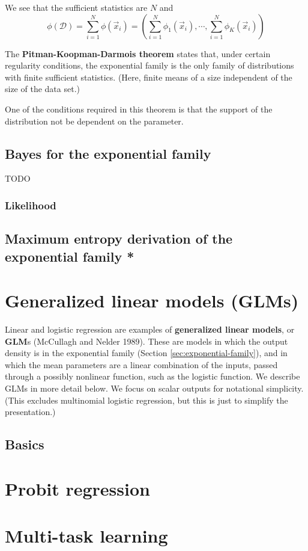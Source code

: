 We see that the sufficient statistics are $N$ and
\begin{equation}
\phi(\mathcal{D})=\sum\limits_{i=1}^N \phi(\vec{x}_i)=(\sum\limits_{i=1}^N \phi_1(\vec{x}_i),\cdots,\sum\limits_{i=1}^N \phi_K(\vec{x}_i))
\end{equation}

The \textbf{Pitman-Koopman-Darmois theorem} states that, under certain regularity conditions, the exponential family is the only family of distributions with finite sufficient statistics. (Here, finite means of a size independent of the size of the data set.)

One of the conditions required in this theorem is that the support of the distribution not be dependent on the parameter.


\subsection{Bayes for the exponential family}
\label{sec:Bayes-for-the-exponential-family}
TODO


\subsubsection{Likelihood}



\subsection{Maximum entropy derivation of the exponential family *}
\label{sec:Maximum-entropy-derivation-of-the-exponential-family}



\section{Generalized linear models (GLMs)}
\label{sec:GLMs}
Linear and logistic regression are examples of \textbf{generalized linear models}, or \textbf{GLM}s (McCullagh and Nelder 1989). These are models in which the output density is in the exponential family (Section \ref{sec:exponential-family}), and in which the mean parameters are a linear combination of the inputs, passed through a possibly nonlinear function, such as the logistic function. We describe GLMs in more detail below. We focus on scalar outputs for notational simplicity. (This excludes multinomial logistic regression, but this is just to simplify the presentation.)


\subsection{Basics}



\section{Probit regression}



\section{Multi-task learning}



